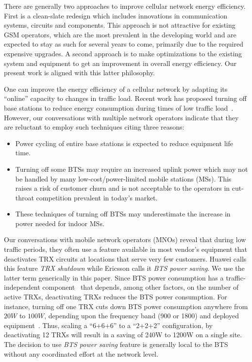 There are generally two approaches to improve cellular network
energy efficiency. First is a clean-slate redesign which includes
innovations in communication systems, circuits and components.
This approach is not attractive for existing GSM operators,
which are the most prevalent in the developing world and are
expected to stay as such for several years to come, primarily due to the required expensive upgrades. 
A second approach is to make optimizations to the existing system
and equipment to get an improvement in overall energy
efficiency. Our present work is aligned with this latter
philosophy.

One can improve the energy efficiency of a cellular network by
adapting its ``online'' capacity to changes in traffic load.
Recent work has proposed turning off base stations to reduce
energy consumption during times of low traffic
load~\cite{Louhi:2007:BTSPower:INTELEC,Oh:Comm:2011,Peng:2011:BTSSaving:Mobicom,He:CellularPower:JN:2012}.
However, our conversations with multiple network operators
indicate that they are reluctant to employ such techniques
citing three reasons:
\begin{itemize}
\item Power cycling of entire base stations is expected to
    reduce equipment life time.
\item Turning off some BTSs may require an increased uplink
    power which may not be handled by many low-cost/power-limited mobile
    stations (MSs). This raises a risk of customer churn and is
    not acceptable to the operators in cut-throat
    competition prevalent in today's market.
\item These techniques of turning off BTSs may
    underestimate the increase in power needed for indoor
    MSs.
\end{itemize}

Our conversations with
mobile network operators (MNOs) reveal that during low traffic periods, they often use a feature available in most vendor's equipment that deactivates TRX circuits at locations that
serve very few customers. Huawei calls this feature \textit{TRX shutdown} while Ericsson calls it \textit{BTS power saving}. We use the latter term generically in this paper. Since BTS power consumption has a traffic-independent
component~\cite{Peng:2011:BTSSaving:Mobicom} that depends,
among other factors, on the number of active TRXs, deactivating
TRXs reduces the BTS power consumption. For instance, turning
off one TRX cuts down BTS power consumption anywhere from $20W$
to $100W$, depending upon the frequency band (900 or 1800) and
deployed
equipment~\cite{Lorincz:BTS-Measure:Sensors:2012,flexibsc}.
Thus, scaling a ``6+6+6'' to a ``2+2+2'' configuration, by deactivating 12
TRXs will result in a saving of
240W to 1200W on a single site. The decision to use \textit{BTS
power saving} feature is generally local to the BTS without any
coordinated effort at the network level.

